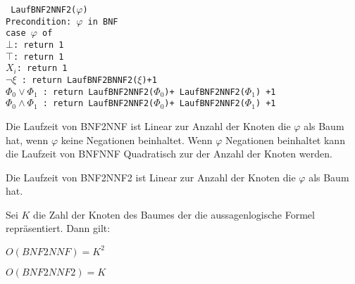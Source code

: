 \texttt{
	LaufBNF2NNF2($\varphi$) \\
	Precondition: $\varphi$ in BNF \\
	case $\varphi$ of \\
		$\bot$: return 1 \\
		$\top$: return 1 \\
		$X_i$: return 1 \\
		$\neg \xi$ : return LaufBNF2BNNF2($\xi$)+1 \\
		$\Phi_0 \vee \Phi_1$ : return LaufBNF2NNF2($\Phi_0$)+ LaufBNF2NNF2($\Phi_1$) +1 \\
		$\Phi_0 \wedge \Phi_1$ : return LaufBNF2NNF2($\Phi_0$)+ LaufBNF2NNF2($\Phi_1$) +1\\
}

Die Laufzeit von BNF2NNF ist Linear zur Anzahl der Knoten die $\varphi$ als Baum hat, wenn $\varphi$ keine Negationen beinhaltet.
Wenn $\varphi$ Negationen beinhaltet kann die Laufzeit von BNFNNF Quadratisch zur der Anzahl der Knoten werden.

Die Laufzeit von BNF2NNF2 ist Linear zur Anzahl der Knoten die $\varphi$ als Baum hat.

Sei $K$ die Zahl der Knoten des Baumes der die aussagenlogische Formel repräsentiert.
Dann gilt:

$O(BNF2NNF) = K^2$ 

$O(BNF2NNF2) = K$ 

